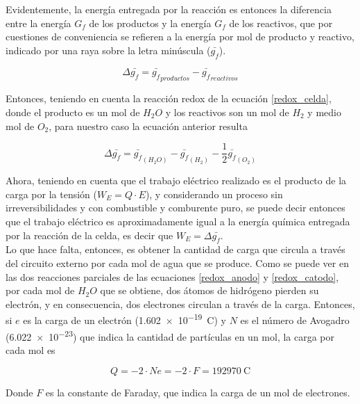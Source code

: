 Evidentemente, la energía entregada por la reacción es entonces la diferencia entre la energía $G_f$ de los productos y la energía $G_f$ de los reactivos, que por cuestiones de conveniencia se refieren a la energía por mol de producto y reactivo, indicado por una raya sobre la letra minúscula ($\bar{g_f}$).

\begin{equation}\label{delta_gibbs}
    \Delta\bar{g_f} = \bar{g_f}_{productos} - \bar{g_f}_{reactivos}
\end{equation}

Entonces, teniendo en cuenta la reacción redox de la ecuación \ref{redox_celda}, donde el producto es un mol de $H_2O$ y los reactivos son un mol de $H_2$ y medio mol de $O_2$, para nuestro caso la ecuación anterior resulta

\begin{equation}\label{delta_gibbs_celda}
    \Delta\bar{g_f} = \bar{g_f}_{(H_2O)} - \bar{g_f}_{(H_2)} - \frac{1}{2}\bar{g_f}_{(O_2)}
\end{equation}

Ahora, teniendo en cuenta que el trabajo eléctrico realizado es el producto de la carga por la tensión ($W_E=Q\cdot E$), y considerando un proceso sin irreversibilidades y con combustible y comburente puro, se puede decir entonces que el trabajo eléctrico es aproximadamente igual a la energía química entregada por la reacción de la celda, es decir que $W_E = \Delta\bar{g_f}$.\\

Lo que hace falta, entonces, es obtener la cantidad de carga que circula a través del circuito externo por cada mol de agua que se produce. Como se puede ver en las dos reacciones parciales de las ecuaciones \ref{redox_anodo} y \ref{redox_catodo}, por cada mol de $H_2O$ que se obtiene, dos átomos de hidrógeno pierden su electrón, y en consecuencia, dos electrones circulan a través de la carga. Entonces, si $e$ es la carga de un electrón (\SI{1.602e-19}{\coulomb}) y $N$ es el número de Avogadro (\num{6.022e-23}) que indica la cantidad de partículas en un mol, la carga por cada mol es

\begin{equation}\label{carga_mol}
    Q=-2\cdot Ne=-2\cdot F=\SI{192970}{\coulomb}
\end{equation}

Donde $F$ es la constante de Faraday, que indica la carga de un mol de electrones.\\

